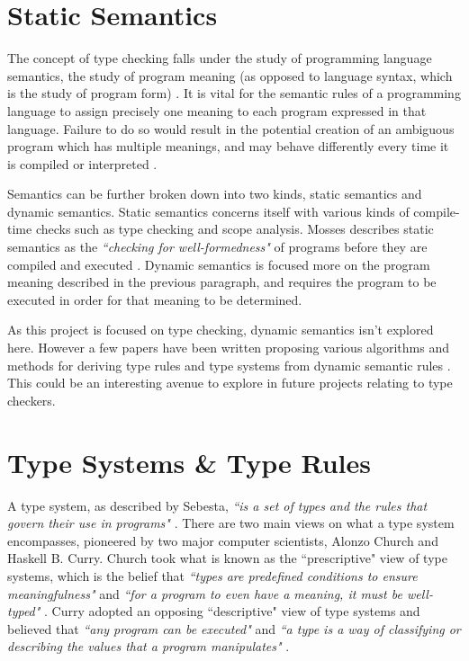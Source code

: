 \documentclass{UoYCSproject}
\begin{document}
\section{Static Semantics}
The concept of type checking falls under the study of programming language
semantics, the study of program meaning (as opposed to language syntax, which is
the study of program form) \cite[\S3.1, p.~114]{Sebesta}. It is vital for the 
semantic rules of a programming language to assign precisely one meaning to 
each program expressed in that language. Failure to do so would result in the 
potential creation of an ambiguous program which has multiple meanings, and may 
behave differently every time it is compiled or interpreted 
\cite[\S3.3.1.7 ,p.~123]{Sebesta}.

Semantics can be further broken down into two kinds, static semantics and
dynamic semantics. Static semantics concerns itself with various kinds
of compile-time checks such as type checking and scope analysis. Mosses
describes static semantics as the \textit{``checking for well-formedness"} of
programs before they are compiled and executed \cite{Mosses}. Dynamic
semantics is focused more on the program meaning described in the previous
paragraph, and requires the program to be executed in order for that meaning to
be determined.

As this project is focused on type checking, dynamic semantics
isn't explored here. However a few papers have been written
proposing various algorithms and methods for deriving type rules and type
systems from dynamic semantic rules \cite{NeilJones} \cite{JohnHannan}. This could
be an interesting avenue to explore in future projects relating to type checkers.

\section{Type Systems \& Type Rules}
\label{sec:Chap1TypeSystems}

A type system, as described by Sebesta, \textit{``is a set of types and the rules that
    govern their use in programs"} \cite[\S6.15, p.~309]{Sebesta}.
There are two main views on what a type system encompasses, pioneered by two
major computer scientists, Alonzo Church and Haskell B. Curry.
Church took what is known as the ``prescriptive" view of type systems, which is
the belief that \textit{``types are predefined conditions to ensure meaningfulness"}
and \textit{``for a program to even have a meaning, it must be well-typed"}
\cite{NeilJones}. Curry adopted an opposing ``descriptive" view of type systems
and believed that \textit{``any program can be executed"} and \textit{``a type
    is a way of classifying or describing the values that a program manipulates"}
\cite{NeilJones}.
\end{document}

